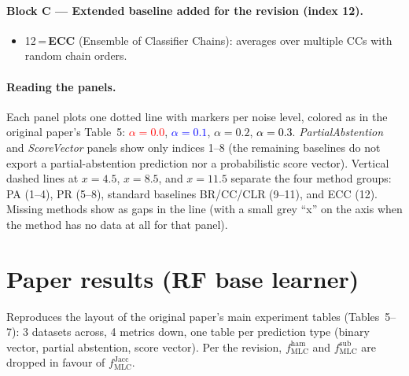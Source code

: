 \documentclass[11pt]{article}
\begin{document}
\paragraph{Block C --- Extended baseline added for the revision
(index 12).}
\begin{itemize}
  \item 12\,=\,\textbf{ECC} (Ensemble of Classifier Chains): averages over
        multiple CCs with random chain orders.
\end{itemize}

\paragraph{Reading the panels.} Each panel plots one dotted line with
markers per noise level, colored as in the original paper's Table~5:
\textcolor{red}{$\alpha=0.0$}, \textcolor{blue}{$\alpha=0.1$},
\textcolor{green!60!black}{$\alpha=0.2$}, \textcolor{black}{$\alpha=0.3$}.
\emph{PartialAbstention} and \emph{ScoreVector} panels show only indices
1--8 (the remaining baselines do not export a partial-abstention prediction
nor a probabilistic score vector). Vertical dashed lines at $x=4.5$,
$x=8.5$, and $x=11.5$ separate the four method groups: PA (1--4), PR
(5--8), standard baselines BR/CC/CLR (9--11), and ECC (12). Missing methods show as gaps in the line (with a small grey
``x'' on the axis when the method has no data at all for that panel).

\clearpage

\section{Paper results (RF base learner)}

Reproduces the layout of the original paper's main experiment tables (Tables~5--7): 3 datasets across, 4 metrics down, one table per prediction type (binary vector, partial abstention, score vector). Per the revision, $f^{\mathrm{ham}}_{\mathrm{MLC}}$ and $f^{\mathrm{sub}}_{\mathrm{MLC}}$ are dropped in favour of $f^{\mathrm{Jacc}}_{\mathrm{MLC}}$.


\end{document}
